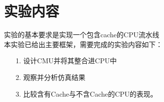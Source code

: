 
\section{实验内容}
实验的基本要求是实现一个包含cache的CPU流水线 \\
本实验已给出主要框架，需要完成的实验内容如下：
\begin{itemize}
    \item [1.] 设计CMU并将其整合进CPU中
    \item [2.] 观察并分析仿真结果
    \item [3.] 比较含有Cache与不含Cache的CPU的表现。
\end{itemize}  